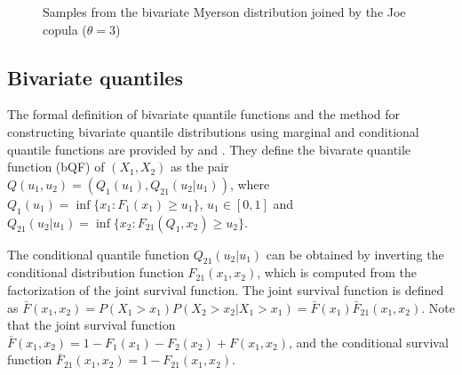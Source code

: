 \documentclass[
  fleqn,
  deca,
  blindrev
]{informs4}
\begin{document}
\begin{figure}


\caption{\label{fig-bc-myerson}Samples from the bivariate Myerson
distribution joined by the Joe copula (\(\theta=3\))}

\end{figure}%

\subsection{Bivariate quantiles}\label{bivariate-quantiles}

The formal definition of bivariate quantile functions and the method for
constructing bivariate quantile distributions using marginal and
conditional quantile functions are provided by
\citet{nair2023PropertiesBivariateDistributions} and
\citet{vineshkumar2019BivariateQuantileFunctions}. They define the
bivarate quantile function (bQF) of \((X_1, X_2)\) as the pair
\(Q(u_1, u_2)=(Q_1(u_1), Q_{21}(u_2\vert u_1))\), where
\(Q_1(u_1)=\inf \{x_1: F_1(x_1)\geq u_1\}\), \(u_1\in[0,1]\) and
\(Q_{21}(u_2\vert u_1)=\inf\{x_2: F_{21}(Q_1, x_2)\geq u_2\}\).

The conditional quantile function \(Q_{21}(u_2\vert u_1)\) can be
obtained by inverting the conditional distribution function
\(F_{21}(x_1, x_2)\), which is computed from the factorization of the
joint survival function. The joint survival function is defined as
\(\bar{F}(x_1, x_2)=P(X_1> x_1)P(X_2> x_2 \vert X_1 > x_1)= \bar{F}(x_1)\bar{F}_{21}(x_1,x_2)\).
Note that the joint survival function
\(\bar{F}(x_1,x_2)=1-F_1(x_1)-F_2(x_2)+F(x_1,x_2)\), and the conditional
survival function \(\bar{F}_{21}(x_1,x_2)=1-F_{21}(x_1,x_2)\).
\end{document}
